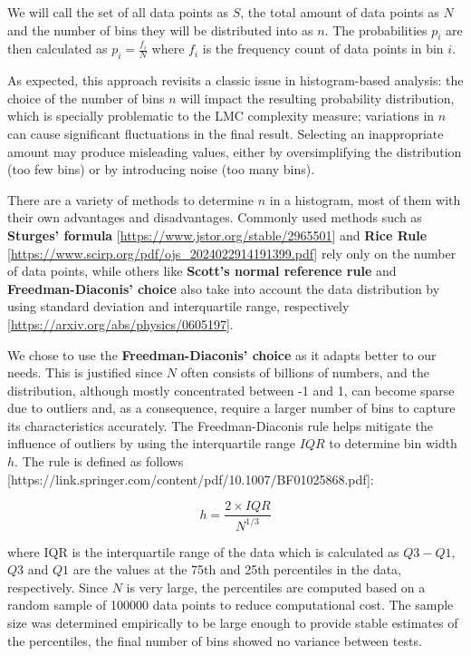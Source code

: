         We will call the set of all data points as \( S \), the total amount of data points as \( N \) and the number of bins they will be distributed into as \( n \). The probabilities \( p_i \) are then calculated as \( p_i = \frac{f_i}{N} \) where \( f_i \) is the frequency count of data points in bin \( i \).

        As expected, this approach revisits a classic issue in histogram-based analysis: the choice of the number of bins \( n \) will impact the resulting probability distribution, which is specially problematic to the LMC complexity measure; variations in \( n \) can cause significant fluctuations in the final result. Selecting an inappropriate amount may produce misleading values, either by oversimplifying the distribution (too few bins) or by introducing noise (too many bins). 

        There are a variety of methods to determine \( n \) in a histogram, most of them with their own advantages and disadvantages. Commonly used methods such as \textbf{Sturges' formula} [\url{https://www.jstor.org/stable/2965501}] and \textbf{Rice Rule} [\url{https://www.scirp.org/pdf/ojs_2024022914191399.pdf}] rely only on the number of data points, while others like \textbf{Scott's normal reference rule} and \textbf{Freedman-Diaconis' choice} also take into account the data distribution by using standard deviation and interquartile range, respectively [\url{https://arxiv.org/abs/physics/0605197}].   

        We chose to use the \textbf{Freedman-Diaconis' choice} as it adapts better to our needs. This is justified since \( N \) often consists of billions of numbers, and the distribution, although mostly concentrated between -1 and 1, can become sparse due to outliers and, as a consequence, require a larger number of bins to capture its characteristics accurately. The Freedman-Diaconis rule helps mitigate the influence of outliers by using the interquartile range \( IQR \) to determine bin width \( h \). The rule is defined as follows [https://link.springer.com/content/pdf/10.1007/BF01025868.pdf]:

        \[ h = \frac{2 \times IQR}{N^{1/3}} \]

        where IQR is the interquartile range of the data which is calculated as \( Q3 - Q1 \), \( Q3 \) and \( Q1 \) are the values at the 75th and 25th percentiles in the data, respectively. Since \( N \) is very large, the percentiles are computed based on a random sample of 100000 data points to reduce computational cost. The sample size was determined empirically to be large enough to provide stable estimates of the percentiles, the final number of bins showed no variance between tests.

